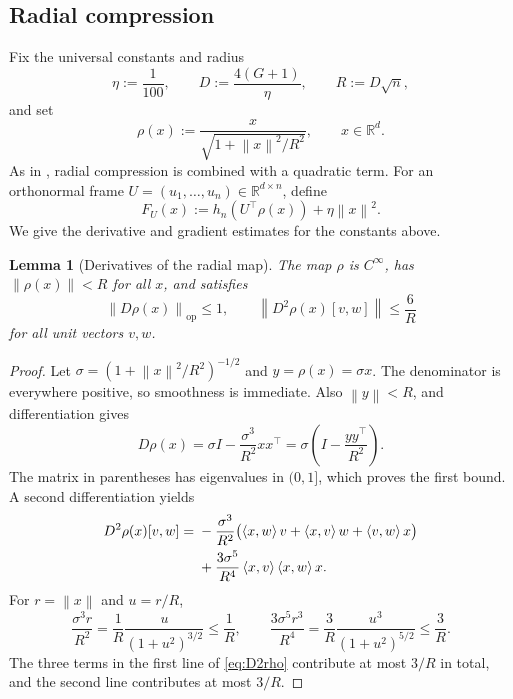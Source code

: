 \documentclass[11pt]{article}
\numberwithin{equation}{section}
\newtheorem{lemma}[lemma]{Lemma}
\theoremstyle{definition}
\theoremstyle{remark}
\newcommand{\R}{\mathbb{R}}
\newcommand{\norm}[1]{\left\lVert #1\right\rVert}
\newcommand{\ip}[2]{\left\langle #1,#2\right\rangle}
\begin{document}
\subsection{Radial compression}

Fix the universal constants and radius
\begin{equation}
    \eta:=\frac1{100},\qquad
    D:=\frac{4(G+1)}{\eta},\qquad R:=D\sqrt n,
    \label{eq:radial-constants}
\end{equation}
and set
\begin{equation}
    \rho(x):=\frac{x}{\sqrt{1+\norm{x}^2/R^2}},
    \qquad x\in\R^d.
    \label{eq:rho}
\end{equation}
As in \citet[Section~5.2]{CDHS2020}, radial compression is combined with a
quadratic term. For an orthonormal frame
$U=(u_1,\ldots,u_n)\in\R^{d\times n}$, define
\begin{equation}
    F_U(x):=h_n(U^\top\rho(x))+\eta\norm{x}^2.
    \label{eq:FU}
\end{equation}
We give the derivative and gradient estimates for the constants above.

\begin{lemma}[Derivatives of the radial map]
\label{lem:rho}
The map $\rho$ is $C^\infty$, has $\norm{\rho(x)}<R$ for all $x$, and satisfies
\begin{equation}
    \norm{D\rho(x)}_{\mathrm{op}}\leq1,
    \qquad
    \norm{D^2\rho(x)[v,w]}\leq\frac6R
    \label{eq:rho-bounds}
\end{equation}
for all unit vectors $v,w$.
\end{lemma}

\begin{proof}
Let $\sigma=(1+\norm{x}^2/R^2)^{-1/2}$ and $y=\rho(x)=\sigma x$.
The denominator is everywhere positive, so smoothness is immediate.
Also $\norm{y}<R$, and differentiation gives
\begin{equation}
    D\rho(x)=\sigma I-\frac{\sigma^3}{R^2}xx^\top
             =\sigma\left(I-\frac{yy^\top}{R^2}\right).
    \label{eq:Drho}
\end{equation}
The matrix in parentheses has eigenvalues in $(0,1]$, which proves the
first bound. A second differentiation yields
\begin{align}
 D^2\rho(x)[v,w]
 ={}&-\frac{\sigma^3}{R^2}
       \bigl(\ip{x}{w}v+\ip{x}{v}w+\ip{v}{w}x\bigr)\notag\\
    &+\frac{3\sigma^5}{R^4}\ip{x}{v}\ip{x}{w}x.
 \label{eq:D2rho}
\end{align}
For $r=\norm{x}$ and $u=r/R$,
\[
    \frac{\sigma^3r}{R^2}
     =\frac1R\frac{u}{(1+u^2)^{3/2}}\leq\frac1R,
    \qquad
    \frac{3\sigma^5r^3}{R^4}
     =\frac3R\frac{u^3}{(1+u^2)^{5/2}}\leq\frac3R.
\]
The three terms in the first line of \eqref{eq:D2rho} contribute at most
$3/R$ in total, and the second line contributes at most $3/R$.
\end{proof}
\end{document}
